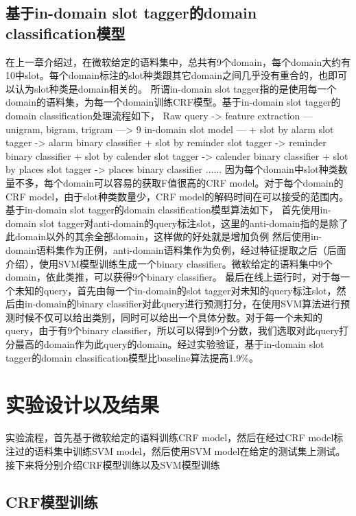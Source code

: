 \documentclass[master]{njuthesis}
\begin{document}
\subsection{基于in-domain slot tagger的domain classification模型}

    在上一章介绍过，在微软给定的语料集中，总共有9个domain，每个domain大约有10中slot。每个domain标注的slot种类跟其它domain之间几乎没有重合的，也即可以认为slot种类是domain相关的。
    所谓in-domain slot tagger指的是使用每一个domain的语料集，为每一个domain训练CRF模型。基于in-domain slot tagger的domain classification处理流程如下，
Raw query -> feature extraction --- unigram, bigram, trigram ---> 9 in-domain slot model --- + slot by alarm slot tagger -> alarm binary classifier
 + slot by reminder slot tagger -> reminder binary classifier
 + slot by calender slot tagger -> calender binary classifier
 + slot by places slot tagger -> places binary classifier
......
    因为每个domain中slot种类数量不多，每个domain可以容易的获取F值很高的CRF model。对于每个domain的CRF model，由于slot种类数量少，CRF model的解码时间在可以接受的范围内。
    基于in-domain slot tagger的domain classification模型算法如下，
    首先使用in-domain slot tagger对anti-domain的query标注slot，这里的anti-domain指的是除了此domain以外的其余全部domain，这样做的好处就是增加负例
    然后使用in-domain语料集作为正例，anti-domain语料集作为负例，经过特征提取之后（后面介绍），使用SVM模型训练生成一个binary classifier。微软给定的语料集中9个domain，依此类推，可以获得9个binary classifier。
    最后在线上运行时，对于每一个未知的query，首先由每一个in-domain的slot tagger对未知的query标注slot，然后由in-domain的binary classifier对此query进行预测打分，在使用SVM算法进行预测时候不仅可以给出类别，同时可以给出一个具体分数。对于每一个未知的query，由于有9个binary classifier，所以可以得到9个分数，我们选取对此query打分最高的domain作为此query的domain。经过实验验证，基于in-domain slot tagger的domain classification模型比baseline算法提高1.9\%。

\section{实验设计以及结果}
    
    实验流程，首先基于微软给定的语料训练CRF model，然后在经过CRF model标注过的语料集中训练SVM model，然后使用SVM model在给定的测试集上测试。接下来将分别介绍CRF模型训练以及SVM模型训练
\subsection{CRF模型训练}
\end{document}
